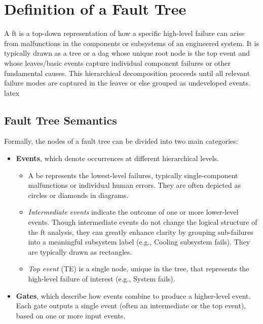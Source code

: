 \section{Definition of a Fault Tree}
\label{sec:fault_tree_definition}
A \acrfull{ft} is a top-down representation of how a specific high-level failure can arise from malfunctions in the components or subsystems of an engineered system. It is typically drawn as a tree or a \acrfull{dag} whose unique root node is the top event and whose leaves/basic events capture individual component failures or other fundamental causes. This hierarchical decomposition proceeds until all relevant failure modes are captured in the leaves or else grouped as undeveloped events.  \Gls{latex}

\subsection{Fault Tree Semantics}
Formally, the nodes of a fault tree can be divided into two main categories:  
\begin{itemize}
  \item \textbf{Events}, which denote occurrences at different hierarchical levels.  
    \begin{itemize}
      \item A \acrfull{be} represents the lowest-level failures, typically single-component malfunctions or individual human errors. They are often depicted as circles or diamonds in diagrams.  
      \item \emph{Intermediate events} indicate the outcome of one or more lower-level events. Though intermediate events do not change the logical structure of the \acrshort{ft} analysis, they can greatly enhance clarity by grouping sub-failures into a meaningful subsystem label (e.g., Cooling subsystem fails). They are typically drawn as rectangles.  
      \item \emph{Top event} (TE) is a single node, unique in the tree, that represents the high-level failure of interest (e.g., System fails).
    \end{itemize}
  \item \textbf{Gates}, which describe how events combine to produce a higher-level event. Each gate outputs a single event (often an intermediate or the top event), based on one or more input events.  
\end{itemize}

